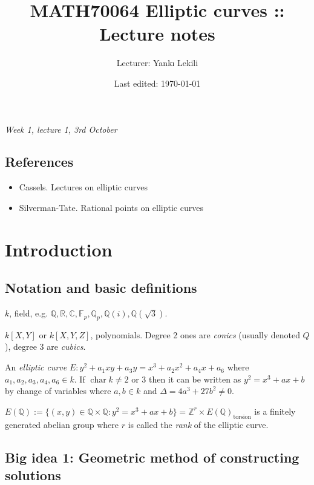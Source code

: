\documentclass{article}
\title{MATH70064 Elliptic curves :: Lecture notes}
\author{Lecturer: Yankı Lekili}
\date{Last edited: \today}
\newcommand{\F}{\mathbb{F}}
\newcommand{\Z}{\mathbb{Z}}
\newcommand{\Q}{\mathbb{Q}}
\newcommand{\R}{\mathbb{R}}
\newcommand{\C}{\mathbb{C}}
\newcommand{\Char}{\operatorname{char}}
\theoremstyle{definition}
\begin{document}
\maketitle
\thispagestyle{empty}

\tableofcontents
\thispagestyle{empty}
\newpage
\setcounter{page}{1}

\begin{flushright}
\textit{Week 1, lecture 1, 3rd October}
\end{flushright}

\subsection*{References}
\begin{itemize}
\item Cassels. Lectures on elliptic curves
\item Silverman-Tate. Rational points on elliptic curves
\end{itemize}

\section{Introduction}
\subsection{Notation and basic definitions}
$k$, field, e.g. $\Q, \R, \C, \F_p, \Q_p, \Q(i), \Q(\sqrt 3)$.

$k[X,Y]$ or $k[X,Y,Z]$, polynomials. Degree 2 ones are \textit{conics} (usually denoted $Q$), degree 3 are \textit{cubics}.

An \textit{elliptic curve} $E: y^2+a_1xy+a_3y=x^3+a_2x^2+a_4x+a_6$ where $a_1,a_2,a_3,a_4,a_6\in k$. If $\Char k\neq 2$ or 3 then it can be written as $y^2=x^3+ax+b$ by change of variables where $a,b\in k$ and $\Delta=4a^3+27b^2\neq 0$.

$E(\Q):=\{(x,y)\in \Q\times \Q:y^2=x^3+ax+b\}=\Z^r\times E(\Q)_{\text{torsion}}$ is a finitely generated abelian group where $r$ is called the \textit{rank} of the elliptic curve.

\subsection{Big idea 1: Geometric method of constructing solutions}
\end{document}
